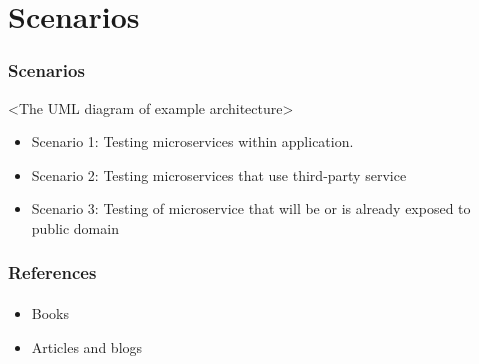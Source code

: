 \documentclass{beamer}
\begin{document}
\section{Scenarios}
\begin{frame}
	\frametitle{Scenarios}
	<The UML diagram of example architecture>
	\begin{itemize}
 		 \item Scenario 1: Testing microservices within application. \\
			 
		 \item Scenario 2: Testing microservices that use third-party service
		 \item Scenario 3: Testing of microservice that will be or is already exposed to public domain
	\end{itemize}
\end{frame}

\begin{frame}
	\frametitle{References}
	\framesubtitle{}
	\begin{itemize}
 		 \item Books
		 \item Articles and blogs
	\end{itemize}
\end{frame}




\end{document}
